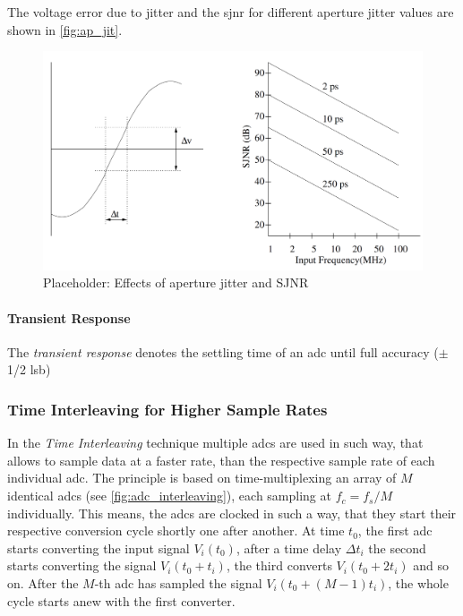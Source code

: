 The voltage error due to jitter and the \gls{sjnr} for different aperture jitter values are shown in \autoref{fig:ap_jit}.

\begin{figure}[tbh]
	\centering
	\includegraphics[width = \textwidth]{chap/02-theory/img/ap_jit}
	\caption{Placeholder: Effects of aperture jitter and SJNR \cite{Lundberg}}
	\label{fig:ap_jit}
\end{figure}

\paragraph{Transient Response}
The \textit{transient response} denotes the settling time of an \gls{adc} until full accuracy ($\pm$ 1/2 \gls{lsb})

\subsubsection*{Time Interleaving for Higher Sample Rates}
In the \textit{Time Interleaving} technique multiple \glspl{adc} are used in such way, that allows to sample data at a faster rate, than the respective sample rate of each individual \gls{adc}. The principle is based on time-multiplexing an array of $M$ identical \glspl{adc} (see \autoref{fig:adc_interleaving}), each sampling at $f_c = f_s/M$ individually. This means, the \glspl{adc} are clocked in such a way, that they start their respective conversion cycle shortly one after another. At time $t_0$, the first \gls{adc} starts converting the input signal $V_i(t_0)$, after a time delay $\Delta t_i$ the second starts converting the signal $V_i(t_0 + t_i)$, the third converts  $V_i(t_0 + 2t_i)$ and so on. After the $M$-th \gls{adc} has sampled the signal $V_i(t_0 + (M-1)t_i)$, the whole cycle starts anew with the first converter. \cite{mangrob}

